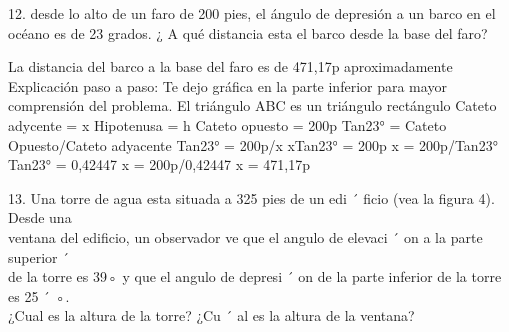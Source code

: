 \documentclass[11pt]{article}
\begin{document}
12. 
desde lo alto de un faro de 200 pies, el ángulo de depresión a un barco en el océano es de 23 grados. ¿ A qué distancia esta el barco desde la base del faro? 

La distancia del barco a la base del faro es de 471,17p aproximadamente  
Explicación paso a paso:
Te dejo gráfica en la parte inferior para mayor comprensión del problema.
El triángulo ABC es un triángulo rectángulo
Cateto adycente = x
Hipotenusa = h
Cateto opuesto = 200p
Tan23° = Cateto Opuesto/Cateto adyacente
Tan23° = 200p/x
xTan23° = 200p
x = 200p/Tan23°                                  Tan23° = 0,42447
x = 200p/0,42447
x =  471,17p

13. Una torre de agua esta situada a 325 pies de un edi ´ ficio (vea la figura 4). Desde una\\
ventana del edificio, un observador ve que el angulo de elevaci ´ on a la parte superior ´\\
de la torre es 39◦ y que el angulo de depresi ´ on de la parte inferior de la torre es 25 ´ ◦.\\
¿Cual es la altura de la torre? ¿Cu ´ al es la altura de la ventana?\\
\end{document}
